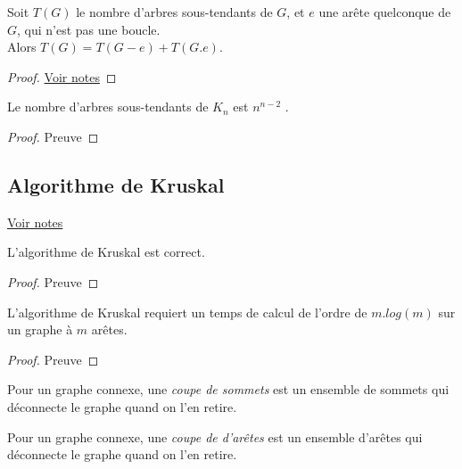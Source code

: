 \begin{myform}   
  Soit $T(G)$ le nombre d’arbres sous-tendants de $G$, et $e$ une arête quelconque de $G$, qui n’est pas une boucle. \\
  Alors $T(G) = T(G − e) + T (G.e)$.
  \begin{proof}
     \href{https://dl.dropboxusercontent.com/u/44092863/Graph_Theory_Romain_Capron.pdf}{Voir notes}
  \end{proof}
\end{myform}

\begin{mytheo}   
  Le nombre d’arbres sous-tendants de $K_n$ est $n^{n−2}$ .
  \begin{proof}
     Preuve
  \end{proof}
\end{mytheo}

\subsection{Algorithme de Kruskal}
\begin{myalgo}
\end{myalgo}

\begin{myexem}
  \href{https://dl.dropboxusercontent.com/u/44092863/Graph_Theory_Romain_Capron.pdf}{Voir notes}
\end{myexem}

\begin{mytheo}
  L’algorithme de Kruskal est correct.
  \begin{proof}
     Preuve
  \end{proof}
\end{mytheo}

\begin{mytheo} 
  L’algorithme de Kruskal requiert un temps de calcul de l’ordre de $m.log(m)$ sur un graphe à $m$ arêtes.
  \begin{proof}
     Preuve
  \end{proof}
\end{mytheo}

\begin{mydef}
  Pour un graphe connexe, une \emph{coupe de sommets} est un ensemble de sommets qui déconnecte le graphe quand on l’en retire.
\end{mydef}

\begin{mydef}
  Pour un graphe connexe, une \emph{coupe de d'arêtes} est un ensemble d’arêtes qui déconnecte le graphe quand on l’en retire.
\end{mydef}

